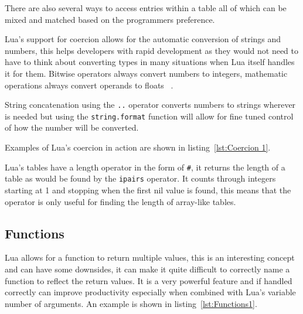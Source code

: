 \documentclass[11pt,a4paper,titlepage]{report}
\begin{document}
	There are also several ways to access entries within a table all of which can be mixed and matched based on the programmers preference.

	\singlespacing
	
	\onehalfspacing


	Lua's support for coercion allows for the automatic conversion of strings and numbers, this helps developers with rapid development as they would not need to have to think about converting types in many situations when Lua itself handles it for them. Bitwise operators always convert numbers to integers, mathematic operations always convert operands to floats ~\cite{LuaMan}.
	
	String concatenation using the \texttt{..} operator converts numbers to strings wherever is needed but using the \texttt{string.format} function will allow for fine tuned control of how the number will be converted.

	Examples of Lua's coercion in action are shown in listing~\ref{lst:Coercion 1}.

	\singlespacing
	
	\onehalfspacing


	Lua's tables have a length operator in the form of \texttt{\#}, it returns the length of a table as would be found by the \texttt{ipairs} operator. It counts through integers starting at 1 and stopping when the first nil value is found, this means that the operator is only useful for finding the length of array-like tables.

\subsection{Functions}
	Lua allows for a function to return multiple values, this is an interesting concept and can have some downsides, it can make it quite difficult to correctly name a function to reflect the return values. It is a very powerful feature and if handled correctly can improve productivity especially when combined with Lua's variable number of arguments. An example is shown in listing~\ref{lst:Functions1}.

	\singlespacing
	
	\onehalfspacing
\end{document}
